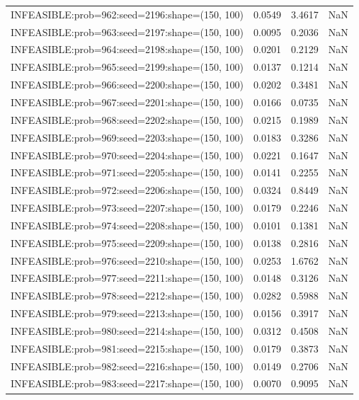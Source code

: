 \begin{longtable}{lccc}
INFEASIBLE:prob=962:seed=2196:shape=(150, 100) &   0.0549 &  3.4617 &    NaN \\
INFEASIBLE:prob=963:seed=2197:shape=(150, 100) &   0.0095 &  0.2036 &    NaN \\
INFEASIBLE:prob=964:seed=2198:shape=(150, 100) &   0.0201 &  0.2129 &    NaN \\
INFEASIBLE:prob=965:seed=2199:shape=(150, 100) &   0.0137 &  0.1214 &    NaN \\
INFEASIBLE:prob=966:seed=2200:shape=(150, 100) &   0.0202 &  0.3481 &    NaN \\
INFEASIBLE:prob=967:seed=2201:shape=(150, 100) &   0.0166 &  0.0735 &    NaN \\
INFEASIBLE:prob=968:seed=2202:shape=(150, 100) &   0.0215 &  0.1989 &    NaN \\
INFEASIBLE:prob=969:seed=2203:shape=(150, 100) &   0.0183 &  0.3286 &    NaN \\
INFEASIBLE:prob=970:seed=2204:shape=(150, 100) &   0.0221 &  0.1647 &    NaN \\
INFEASIBLE:prob=971:seed=2205:shape=(150, 100) &   0.0141 &  0.2255 &    NaN \\
INFEASIBLE:prob=972:seed=2206:shape=(150, 100) &   0.0324 &  0.8449 &    NaN \\
INFEASIBLE:prob=973:seed=2207:shape=(150, 100) &   0.0179 &  0.2246 &    NaN \\
INFEASIBLE:prob=974:seed=2208:shape=(150, 100) &   0.0101 &  0.1381 &    NaN \\
INFEASIBLE:prob=975:seed=2209:shape=(150, 100) &   0.0138 &  0.2816 &    NaN \\
INFEASIBLE:prob=976:seed=2210:shape=(150, 100) &   0.0253 &  1.6762 &    NaN \\
INFEASIBLE:prob=977:seed=2211:shape=(150, 100) &   0.0148 &  0.3126 &    NaN \\
INFEASIBLE:prob=978:seed=2212:shape=(150, 100) &   0.0282 &  0.5988 &    NaN \\
INFEASIBLE:prob=979:seed=2213:shape=(150, 100) &   0.0156 &  0.3917 &    NaN \\
INFEASIBLE:prob=980:seed=2214:shape=(150, 100) &   0.0312 &  0.4508 &    NaN \\
INFEASIBLE:prob=981:seed=2215:shape=(150, 100) &   0.0179 &  0.3873 &    NaN \\
INFEASIBLE:prob=982:seed=2216:shape=(150, 100) &   0.0149 &  0.2706 &    NaN \\
INFEASIBLE:prob=983:seed=2217:shape=(150, 100) &   0.0070 &  0.9095 &    NaN \\

\end{longtable}

